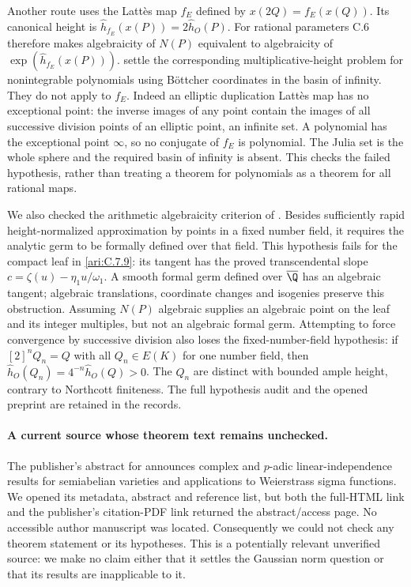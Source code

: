 Another route uses the Latt\`es map $f_E$ defined by
$x(2Q)=f_E(x(Q))$. Its canonical height is
$\widehat h_{f_E}(x(P))=2\widehat h_O(P)$. For rational
parameters C.6 therefore makes algebraicity of $N(P)$
equivalent to algebraicity of
$\exp(\widehat h_{f_E}(x(P)))$.
\citet[Theorem 1.4 and Corollary 1.6]{nguyen2023} settle the
corresponding multiplicative-height problem for nonintegrable
polynomials using B\"ottcher coordinates in the basin of
infinity. They do not apply to $f_E$. Indeed an elliptic
duplication Latt\`es map has no exceptional point: the inverse
images of any point contain the images of all successive
division points of an elliptic point, an infinite set. A
polynomial has the exceptional point $\infty$, so no conjugate
of $f_E$ is polynomial. The Julia set is the whole sphere
and the required basin of infinity is absent. This checks
the failed hypothesis, rather than treating a theorem for
polynomials as a theorem for all rational maps.

We also checked the arithmetic algebraicity criterion of
\citet[Theorems 1.3 and 2.3]{xie2024algebraicity}.
Besides sufficiently rapid height-normalized approximation by
points in a fixed number field, it requires the analytic germ
to be formally defined over that field. This hypothesis fails
for the compact leaf in \ref{ari:C.7.9}: its tangent has the proved
transcendental slope
$c=\zeta(u)-\eta_1u/\omega_1$.
A smooth formal germ defined over $\overline{\Q}$ has an
algebraic tangent; algebraic translations, coordinate changes
and isogenies preserve this obstruction. Assuming $N(P)$
algebraic supplies an algebraic point on the leaf and its
integer multiples, but not an algebraic formal germ. Attempting
to force convergence by successive division also loses the
fixed-number-field hypothesis: if $[2]^nQ_n=Q$ with all
$Q_n\in E(K)$ for one number field, then
$\widehat h_O(Q_n)=4^{-n}\widehat h_O(Q)>0$.
The $Q_n$ are distinct with bounded ample height, contrary to
Northcott finiteness. The full hypothesis audit and the opened
preprint are retained in the records.

\paragraph{A current source whose theorem text remains unchecked.}
The publisher's abstract for \citet{pham2025sigma} announces
complex and $p$-adic linear-independence results for semiabelian
varieties and applications to Weierstrass sigma functions.
We opened its metadata, abstract and reference list, but both
the full-HTML link and the publisher's citation-PDF link returned
the abstract/access page. No accessible author manuscript was
located. Consequently we could not check any theorem statement
or its hypotheses. This is a potentially relevant unverified
source: we make no claim either that it settles the Gaussian
norm question or that its results are inapplicable to it.




